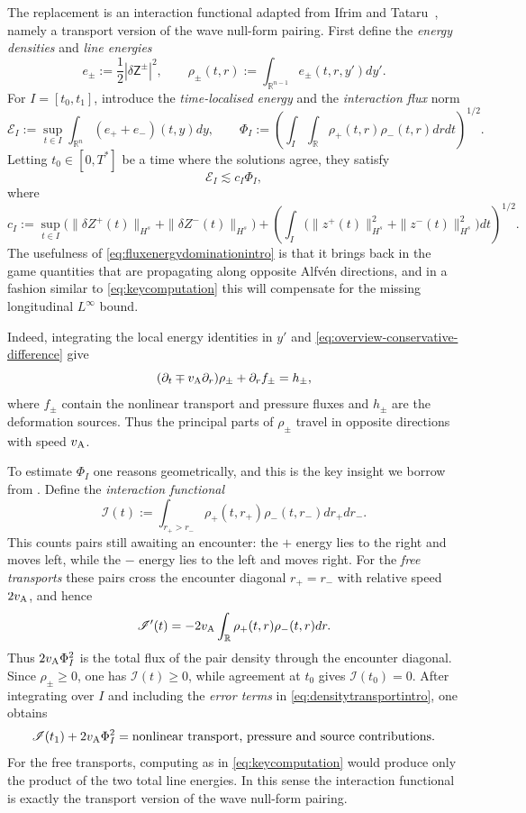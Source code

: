 \documentclass[11pt,reqno]{amsart}
\theoremstyle{plain}
\theoremstyle{definition}
\theoremstyle{remark}
\numberwithin{equation}{section}
\newcommand{\Real}{\mathbb R}
\newcommand{\Rn}{\Real^n}
\begin{document}
The replacement is an interaction functional adapted from Ifrim and
Tataru~\cite{IfrimTataru2025}, namely a transport version of the wave
null-form pairing.  First define the \textit{energy densities} and
\textit{line energies}
\[
 e_\pm:=\frac12|\delta\mathsf Z^\pm|^2,
 \qquad
 \rho_\pm(t,r):=\int_{\Real^{n-1}}e_\pm(t,r,y')dy'.
\]
For $I=[t_0,t_1]$, introduce the \textit{time-localised energy} and the
\textit{interaction flux} norm
\[
 \mathcal E_I:=\sup_{t\in I}\int_{\Rn}(e_++e_-)(t,y)dy,
 \qquad
 \Phi_I:=\left(
 \int_I\int_{\Real}\rho_+(t,r)\rho_-(t,r)dr dt
 \right)^{1/2}.
\]
Letting $t_0\in[0,T^*]$ be a time where the solutions agree, they satisfy
\begin{equation}\label{eq:fluxenergydominationintro}
 \mathcal E_I\lesssim c_I\Phi_I,
\end{equation}
where
\[
 c_I:=
 \sup_{t\in I}\bigl(
   \|\delta Z^+(t)\|_{H^s}+\|\delta Z^-(t)\|_{H^s}\bigr)+\left(\int_I
   \bigl(\|z^+(t)\|_{H^s}^2+\|z^-(t)\|_{H^s}^2\bigr)dt
   \right)^{1/2}.
\]
The usefulness of
\eqref{eq:fluxenergydominationintro} is that it brings back in the game quantities that are propagating along opposite Alfv\'en directions, and in a fashion similar to \eqref{eq:keycomputation} this will compensate for the missing longitudinal $L^\infty$ bound.

Indeed, integrating the local energy identities in $y'$ and \eqref{eq:overview-conservative-difference} give
\begin{equation}\label{eq:densitytransportintro}
 (\partial_t\mp v_{\rm A}\partial_r)\rho_\pm
 +\partial_rf_\pm=h_\pm,
\end{equation}
where $f_\pm$ contain the nonlinear transport and pressure fluxes and
$h_\pm$ are the deformation sources.  Thus the principal parts of
$\rho_\pm$ travel in opposite directions with speed $v_{\rm A}$.

To estimate $\Phi_I$ one reasons geometrically, and this is the key insight
we borrow from
\cite[Sections~6.3.2 and~6.6.3]{IfrimTataru2025}.  Define the
\textit{interaction functional}
\[
 \mathscr I(t):=\int_{r_+>r_-}
 \rho_+(t,r_+)\rho_-(t,r_-)dr_+dr_-.
\]
This counts pairs still awaiting an encounter: the $+$ energy lies to the
right and moves left, while the $-$ energy lies to the left and moves
right.  For the \emph{free transports} these pairs cross the encounter diagonal
$r_+=r_-$ with relative speed $2v_{\rm A}$, and hence
\[
 \mathscr I'(t)
 =-2v_{\rm A}\int_{\Real}\rho_+(t,r)\rho_-(t,r)dr.
\]
Thus $2v_{\rm A}\Phi_I^2$ is the total flux of the pair density through
the encounter diagonal.  Since $\rho_\pm\ge0$, one has
$\mathscr I(t)\ge0$, while agreement at $t_0$ gives
$\mathscr I(t_0)=0$.  After integrating over $I$ and including the \emph{error
terms} in \eqref{eq:densitytransportintro}, one obtains
\begin{equation}\label{eq:fluxbalanceintro}
    \mathscr I(t_1)+2v_{\rm A}\Phi_I^2
 =\text{nonlinear transport, pressure and source contributions}.
\end{equation}
For the free
transports, computing as in \eqref{eq:keycomputation} would produce only the product of the two total line energies.  In this sense the interaction functional is exactly the
transport version of the wave null-form pairing.
\end{document}
